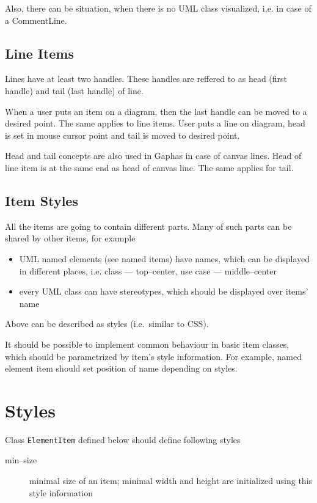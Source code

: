 \documentclass{book}
\newcommand{\rclass}[1]{\texttt{#1}}
\begin{document}
Also, there can be situation, when there is no UML class visualized, i.e.
in case of a CommentLine.

\subsection{Line Items}
Lines have at least two handles. These handles are reffered to as head (first
handle) and tail (last handle) of line.

When a user puts an item on a diagram, then the last handle can be moved to
a desired point. The same applies to line items. User puts a line on diagram,
head is set in mouse cursor point and tail is moved to desired point.

Head and tail concepts are also used in Gaphas in case of canvas lines.
Head of line item is at the same end as head of canvas line. The same
applies for tail.

\subsection{Item Styles}\label{itemstyles}
All the items are going to contain different parts.
Many of such parts can be shared by other items, for example
\begin{itemize}
\item UML named elements (see named items) have names, which
    can be displayed in different places, i.e. class --- top--center,
    use case --- middle--center
\item every UML class can have stereotypes, which should be displayed
    over items' name
\end{itemize}

Above can be described as styles (i.e.\ similar to CSS).

It should be possible to implement common behaviour in basic item classes,
which should be parametrized by item's style information. For example,
named element item should set position of name depending on styles.

\section{Styles}
Class \rclass{ElementItem} defined below should define following styles
\begin{description}
\item[min--size] minimal size of an item; minimal width and height are
    initialized using this style information
\end{description}
\end{document}
